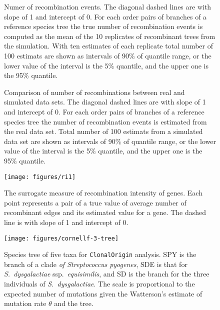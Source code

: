 \documentclass[english]{article}
\begin{document}
\begin{figure}
\caption{\label{fig:h1}Numer of recombination events. The diagonal dashed
lines are with slope of 1 and intercept of 0. For each order
pairs of branches of a reference species tree the true number of recombination
events is computed as the mean of the 10 replicates of recombinant
trees from the simulation. With ten estimates of each replicate total
number of 100 estimats are shown as intervals of 90\% of quantile
range, or the lower value of the interval is the 5\% quantile, and
the upper one is the 95\% quantile. }
\end{figure}
\clearpage{}%

\begin{figure}


\caption{\label{fig:h2}Comparison of number of recombinations between real
and simulated data sets. The diagonal dashed lines are with
slope of 1 and intercept of 0. For each order pairs of branches of
a reference species tree the number of recombination events is estimated
from the real data set. Total number of 100 estimats from a simulated
data set are shown as intervals of 90\% of quantile range, or the
lower value of the interval is the 5\% quantile, and the upper one
is the 95\% quantile. }
\end{figure}
\clearpage{}%


\begin{figure}
\texttt{[image: figures/ri1]}
\caption{\label{fig:ri1}The surrogate measure of recombination intensity
of genes. Each point represents a pair of a true value of average number of
recombinant edges and its estimated value for a gene. The dashed line is with
slope of 1 and intercept of 0.}
\end{figure}
\clearpage{}%



\begin{figure}
\texttt{[image: figures/cornellf-3-tree]}
\caption{\label{fig:tree5}Species tree of five taxa for \texttt{ClonalOrigin} analysis.
SPY is the branch of a clade\textit{ of Streptococcus pyogenes}, SDE
is that for \textit{S.\ dysgalactiae} ssp.\textit{\ equisimilis}, and SD is the
branch for the three individuals of \textit{S.\ dysgalactiae}. The scale is
proportional to the expected number of mutations given the Watterson's estimate 
of mutation
rate $\theta$ and the tree.}
\end{figure}
\clearpage{}%
\end{document}

